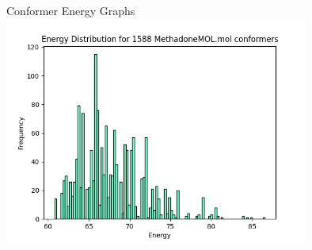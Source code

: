 \documentclass[aspectratio=169]{beamer}
\begin{document}
\begin{frame}{Conformer Energy Graphs}
\includegraphics[width=10cm]{img/Graphs/MethadoneMOL_Energy_Histogram.png}
\end{frame}
\end{document}
